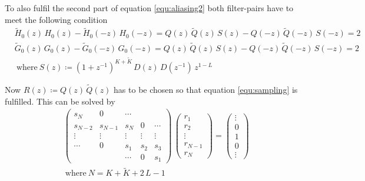 \documentclass[a4paper,12pt]{book}
\begin{document}
To also fulfil the second part of equation \ref{equ:aliasing2} both
filter-pairs have to meet the following condition
\begin{equation}\label{equ:sampling}
  \begin{split}
    &\widetilde{H}_0(z)\,H_0(z)-\widetilde{H}_0(-z)\,H_0(-z)=
    Q(z)\,\widetilde{Q}(z)\,S(z)-Q(-z)\,\widetilde{Q}(-z)\,S(-z)=2\\
    &\widetilde{G}_0(z)\,G_0(z)-\widetilde{G}_0(-z)\,G_0(-z)=Q(z)\,\widetilde{Q}(z)\,S(z)-Q(-z)\,\widetilde{Q}(-z)\,S(-z)=2\\
    &\mathrm{\ where\ }S(z)\coloneqq(1+z^{-1})^{K+\widetilde{K}}\,D(z)\,D(z^{-1})\,z^{1-L}
  \end{split}
\end{equation} %

Now $R(z)\coloneqq Q(z)\,\widetilde{Q}(z)$ has to be chosen so that
equation \ref{equ:sampling} is fulfilled. This can be solved by
\begin{equation}\label{equ:spectrum}
  \begin{split}
    &\begin{pmatrix}
      s_N     & 0       & \cdots &        &        \\
      s_{N-2} & s_{N-1} & s_{N}  & 0      & \cdots \\
      \vdots  & \vdots  & \vdots & \vdots & \vdots \\
      \cdots  & 0       & s_1    & s_2    & s_3    \\
      &         & \cdots & 0      & s_1
    \end{pmatrix}\,
    \begin{pmatrix}
      r_1\\r_2\\\vdots\\r_{N-1}\\r_N
    \end{pmatrix}=
    \begin{pmatrix}
      \vdots\\0\\1\\0\\\vdots
    \end{pmatrix}\\
    &\mathrm{\ where\ }N=K+\widetilde{K}+2\,L-1
  \end{split}
\end{equation}
\end{document}

